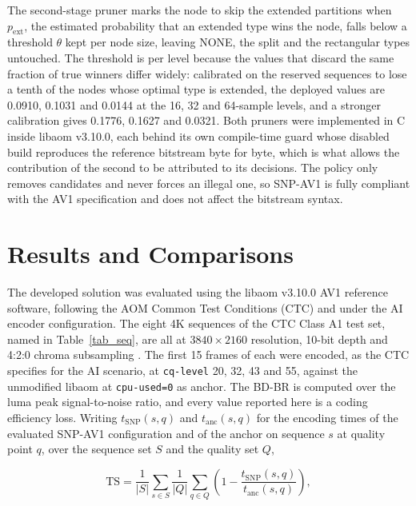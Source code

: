 \documentclass[conference]{IEEEtran}
\begin{document}
The second-stage pruner marks the node to skip the extended partitions when
$p_{\mathrm{ext}}$, the estimated probability that an extended type wins the node,
falls below a threshold $\theta$ kept per node size, leaving NONE, the split and
the rectangular types untouched. The threshold is per level because the values
that discard the same fraction of true winners differ widely: calibrated on the
reserved sequences to lose a tenth of the nodes whose optimal type is extended,
the deployed values are 0.0910, 0.1031 and 0.0144 at the 16, 32 and 64-sample
levels, and a stronger calibration gives 0.1776, 0.1627 and 0.0321. Both pruners
were implemented in C inside libaom v3.10.0, each behind its own compile-time
guard whose disabled build reproduces the reference bitstream byte for byte,
which is what allows the contribution of the second to be attributed to its
decisions. The policy only removes candidates and never forces an illegal one, so
SNP-AV1 is fully compliant with the AV1 specification and does not affect the
bitstream syntax.

\section{Results and Comparisons}
\label{sec_results}

The developed solution was evaluated using the libaom v3.10.0 AV1 reference
software, following the AOM Common Test Conditions (CTC) \cite{ctc} and under the
AI encoder configuration. The eight 4K sequences of the CTC Class A1 test set,
named in Table~\ref{tab_seq}, are all at $3840\times2160$ resolution, 10-bit depth
and 4:2:0 chroma subsampling \cite{xipha1}. The first 15 frames of each were
encoded, as the CTC specifies for the AI scenario, at \texttt{cq-level} 20, 32, 43
and 55, against the unmodified libaom at \texttt{cpu-used=0} as anchor. The BD-BR
\cite{bjontegaard} is computed over the luma peak signal-to-noise ratio, and
every value reported here is a coding efficiency loss. Writing
$t_{\mathrm{SNP}}(s,q)$ and $t_{\mathrm{anc}}(s,q)$ for the encoding times of the
evaluated SNP-AV1 configuration and of the anchor on sequence $s$ at quality
point $q$, over the sequence set $S$ and the quality set $Q$,

\begin{equation}
\mathrm{TS} = \frac{1}{|S|} \sum_{s \in S} \frac{1}{|Q|} \sum_{q \in Q}
\left( 1 - \frac{t_{\mathrm{SNP}}(s,q)}{t_{\mathrm{anc}}(s,q)} \right),
\label{eq_ts}
\end{equation}
\end{document}
